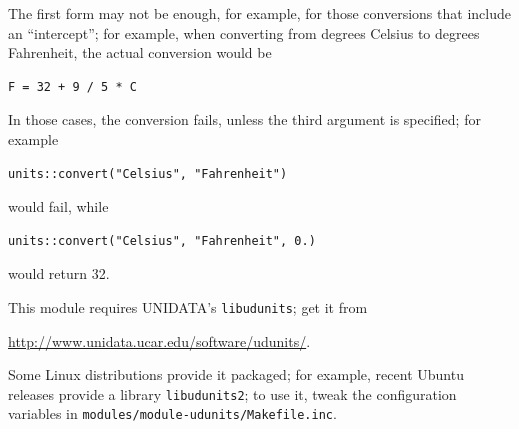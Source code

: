 The first form may not be enough, for example, for those conversions
that include an ``intercept''; for example, when converting from degrees 
Celsius to degrees Fahrenheit, the actual conversion would be
\begin{Verbatim}[commandchars=\\\{\}]
    F = 32 + 9 / 5 * C
\end{Verbatim}
In those cases, the conversion fails, unless the third argument 
is specified; for example
\begin{Verbatim}[commandchars=\\\{\}]
    units::convert("Celsius", "Fahrenheit")
\end{Verbatim}
would fail, while
\begin{Verbatim}[commandchars=\\\{\}]
    units::convert("Celsius", "Fahrenheit", 0.)
\end{Verbatim}
would return 32.

This module requires UNIDATA's \texttt{libudunits}; get it from
\begin{center}
\url{http://www.unidata.ucar.edu/software/udunits/}.
\end{center}
Some Linux distributions provide it packaged;
for example, recent Ubuntu releases provide a library \texttt{libudunits2};
to use it, tweak the configuration variables
in \texttt{modules/module-udunits/Makefile.inc}.



